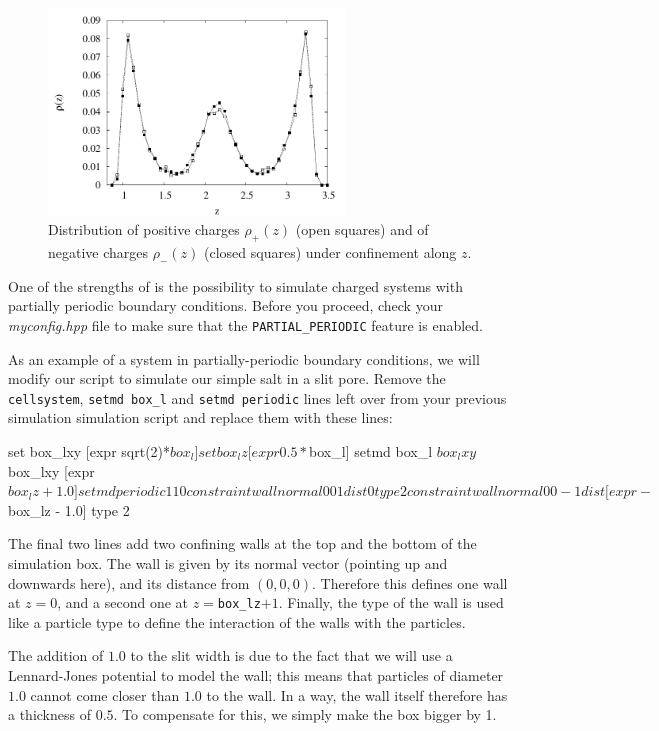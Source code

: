 \documentclass[
a4paper,                        %
11pt,                           %
twoside,                        %
footsepline,                    %
headsepline,                    %
headexclude,                    %
footexclude,                    %
pagesize,                       %
]{scrartcl}
\begin{document}
\begin{figure}[h]
  \centering
  \includegraphics[width=0.7\textwidth]{figures/neutral-rho}
  \caption{Distribution of positive charges $\rho_+(z)$ (open squares)
    and of negative charges $\rho_-(z)$ (closed squares) under
    confinement along $z$.}
  \label{fig:neutralrho}
\end{figure}

One of the strengths of \es{} is the possibility to simulate charged
systems with partially periodic boundary conditions.
Before you proceed, check your \emph{myconfig.hpp} file to make
sure that the \verb|PARTIAL_PERIODIC| feature is enabled.

As an example of a system in partially-periodic boundary conditions,
we will modify our script to simulate our simple salt in a slit pore.
Remove the \verb|cellsystem|, \verb|setmd box_l| and \verb|setmd periodic| lines left
over from your previous simulation simulation script and replace them
with these lines:

\begin{tclcode}
  set box_lxy [expr sqrt(2)*$box_l]
  set box_lz  [expr 0.5*$box_l]
  setmd box_l $box_lxy $box_lxy [expr $box_lz + 1.0]
  setmd periodic 1 1 0
  constraint wall normal 0 0  1 dist 0 type 2
  constraint wall normal 0 0 -1 dist [expr -$box_lz - 1.0] type 2
\end{tclcode}

The final two lines add two confining walls at the top
and the bottom of the simulation box. The wall is given by its normal
vector (pointing up and downwards here), and its distance from
$(0,0,0)$. Therefore this defines one wall at $z=0$, and a second
one at $z=$\verb|box_lz|$+1$. Finally, the type of the wall is used like a
particle type to define the interaction of the walls with the particles.

The addition of $1.0$ to the slit width is due to the fact that we will
use a Lennard-Jones potential to model the wall; this means that
particles of diameter $1.0$ cannot come closer than $1.0$ to the wall. In a
way, the wall itself therefore has a thickness of $0.5$. To compensate
for this, we simply make the box bigger by 1.
\end{document}
